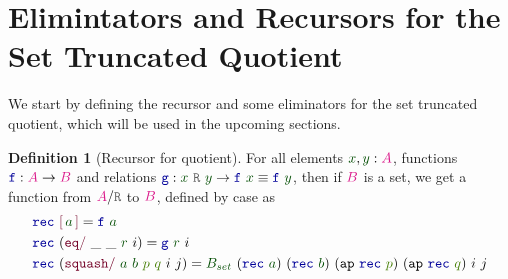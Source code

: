 \documentclass[twoside,11pt,openright]{report}
\theoremstyle{plain} %
\theoremstyle{definition}
\newtheorem{defn}[thm]{Definition}%
\theoremstyle{remark}
\newcommand*{\term}[1]{\textcolor{green!30!black}{#1}} %
\newcommand*{\pathterm}[1]{\textcolor{green!65!red!75!black}{#1}}
\newcommand*{\type}[1]{\textcolor{magenta!90!black}{#1}}
\newcommand*{\relation}[1]{\textcolor{gray!75!black}{\ensuremath{\mathtt{#1}}}}
\newcommand*{\function}[1]{\textcolor{blue!60!black}{\ensuremath{\mathtt{#1}}}}
\newcommand*{\constructor}[1]{\textcolor{purple!60!black}{\ensuremath{\mathtt{#1}}}}
\newcommand*{\quotientconstructor}[1]{\constructor{[}\,#1\,\constructor{]}}
\begin{document}
\section{Elimintators and Recursors for the Set Truncated Quotient}
We start by defining the recursor and some eliminators for the set truncated quotient, which will be used in the upcoming sections.
\begin{defn}[Recursor for quotient]
  \label{defn:quotient-recursor}
  For all elements \(\term{x}, \term{y} : \type{A}\), functions \(\function{f} : \type{A} \rightarrow \type{B}\) and relations \(\function{g} : \term{x}~\relation{R}~\term{y} \rightarrow \function{f}~\term{x} \equiv \function{f}~\term{y}\), then if \(\type{B}\) is a set, we get a function from \(\type{A} / \relation{R}\) to \(\type{B}\), defined by case as
  \begin{equation}
    \label{eq:quotient-recursor}
    \begin{aligned}
      &\function{rec}~\quotientconstructor{\term{a}} = \function{f}~\term{a} \\
      &\function{rec}~(\constructor{eq/}~\_~\_~\term{r}~i) = \function{g}~\term{r}~i \\
      &\function{rec}~(\constructor{squash/}~\term{a}~\term{b}~\pathterm{p}~\pathterm{q}~i~j) = \term{B_{set}}~(\function{rec}~\term{a})~(\function{rec}~\term{b})~(\mathtt{ap}~\function{rec}~\pathterm{p})~(\mathtt{ap}~\function{rec}~\pathterm{q})~i~j
    \end{aligned}
  \end{equation}
\end{defn}
\end{document}
